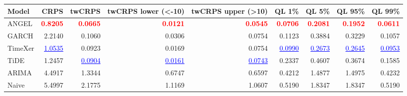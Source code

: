 \begin{tabular}{lrrrrrrrr}
\toprule
Model & CRPS & twCRPS & twCRPS lower (<-10) & twCRPS upper (>10) & QL 1\% & QL 5\% & QL 95\% & QL 99\% \\
\midrule
ANGEL & \textcolor{red}{\textbf{0.8205}} & \textcolor{red}{\textbf{0.0665}} & \textcolor{red}{\textbf{0.0121}} & \textcolor{red}{\textbf{0.0545}} & \textcolor{red}{\textbf{0.0706}} & \textcolor{red}{\textbf{0.2081}} & \textcolor{red}{\textbf{0.1952}} & \textcolor{red}{\textbf{0.0611}} \\
GARCH & 2.2140 & 0.1060 & 0.0306 & 0.0754 & 0.1123 & 0.3884 & 0.3229 & 0.1057 \\
TimeXer & \textcolor{blue}{\underline{1.0535}} & 0.0923 & 0.0169 & 0.0754 & \textcolor{blue}{\underline{0.0990}} & \textcolor{blue}{\underline{0.2673}} & \textcolor{blue}{\underline{0.2645}} & \textcolor{blue}{\underline{0.0953}} \\
TiDE & 1.2457 & \textcolor{blue}{\underline{0.0904}} & \textcolor{blue}{\underline{0.0161}} & \textcolor{blue}{\underline{0.0743}} & 0.2337 & 0.4607 & 0.3674 & 0.1585 \\
ARIMA & 4.4917 & 1.3344 & 0.6747 & 0.6597 & 0.4212 & 1.4877 & 1.4975 & 0.4232 \\
Naive & 5.4997 & 2.1775 & 1.1169 & 1.0607 & 0.5190 & 1.8347 & 1.8347 & 0.5190 \\
\bottomrule
\end{tabular}
